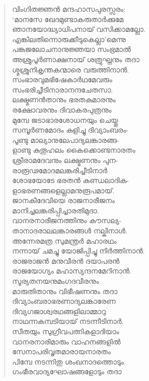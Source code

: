\begin{verse}
വിംഗിതജ്ഞന്‍ മന്ദഹാസപുരസ്സരം:\\
‘മാനസേ ഖേദമുണ്ടാകരുതാര്‍ക്കുമേ\\
ഞാനയോദ്ധ്യാധിപനായ് വസിക്കാമല്ലോ.\\
എങ്കിലതിന്നൊരുക്കീടുകെല്ലാ’മെന്നു\\
പങ്കജലോചനാനുജ്ഞയാ സംഭ്രമാല്‍\\
അശ്രുപൂര്‍ണാക്ഷനായ് ശത്രുഘ്നനും തദാ\\
ശ്മശ്രുനികൃന്തകന്മാരെ വരുത്തിനാന്‍.\\
സംഭാരവുമഭിഷേകാര്‍ഥമേവരും\\
സംഭരിച്ചീടിനാരാനന്ദചേതസാ.\\
ലക്ഷ്മണന്‍താനും ഭരതകുമാരനും\\
രക്ഷോവരനും ദിവാകരപുത്രനും\\
മുമ്പേ ജടാഭാരശോധനയും ചെയ്തു\\
സമ്പൂര്‍ണമോദം കുളിച്ചു ദിവ്യാംബരം-\\
പൂണ്ടു മാല്യാനുലേപാദ്യലങ്കാരങ്ങ-\\
ളാണ്ടു കുതൂഹലം കൈക്കൊണ്ടനാരതം\\
ശ്രീരാമദേവനും ലക്ഷ്മണനും പുന-\\
രാരൂഢമോദമലങ്കരിച്ചീടിനാര്‍\\
ശോഭയോടേ ഭരതന്‍ കുണ്ഡലാദിക-\\
ളാഭരണങ്ങളെല്ലാമനുരൂപമായ്.\\
ജാനകീദേവിയെ രാജനാരീജനം\\
മാനിച്ചലങ്കരിപ്പിച്ചാരതിമുദാ.\\
വാനരനാരീജനത്തിനും കൗസല്യ-\\
താനാദരാലലങ്കാരങ്ങള്‍ നല്കിനാള്‍.\\
അന്നേരമത്ര സുമന്ത്രര്‍ മഹാരഥം\\
നന്നായ് ചമച്ചു യോജിപ്പിച്ചു നിര്‍ത്തിനാന്‍.\\
രാജരാജന്‍ മനുവീരന്‍ ദയാപരന്‍\\
രാജയോഗ്യം മഹാസ്യന്ദനമേറിനാന്‍.\\
സൂര്യതനയനുമംഗദവീരനും\\
മാരുതിതാനും വിഭീഷണനും തദാ\\
ദിവ്യാംബരാഭരണാദ്യലങ്കാരേണ\\
ദിവ്യഗജാശ്വരഥങ്ങളിലാമ്മാറു\\
നാഥന്നകമ്പടിയായ് നടന്നീടിനാര്‍.\\
സീതയും സുഗ്രീവപത്നികളാദിയാം\\
വാനരനാരിമാരും വാഹനങ്ങളില്‍\\
സേനാപരിവൃതമാരായനാരതം\\
പിമ്പേ നടന്നിതു ശംഖനാദത്തൊടും\\
ഗംഭീരവാദ്യഘോഷങ്ങളോടും തദാ\\

\end{verse}
